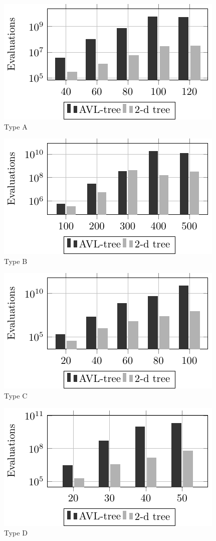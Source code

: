 \centering
\begin{subfigure}{.5\textwidth}
  \centering
  \includegraphics[scale=0.6]{tab/cmp/2dimA}
  \caption{Type A}
  \label{fig:sub1}
\end{subfigure}%
\begin{subfigure}{.5\textwidth}
  \centering
  \includegraphics[scale=0.6]{tab/cmp/2dimB}
  \caption{Type B}
  \label{fig:sub2}
\end{subfigure}
\begin{subfigure}{.5\textwidth}
  \centering
  \includegraphics[scale=0.6]{tab/cmp/2dimC}
  \caption{Type C}
  \label{fig:sub3}
\end{subfigure}%
\begin{subfigure}{.5\textwidth}
  \centering
  \includegraphics[scale=0.6]{tab/cmp/2dimD}
  \caption{Type D}
  \label{fig:sub4}
\end{subfigure}
